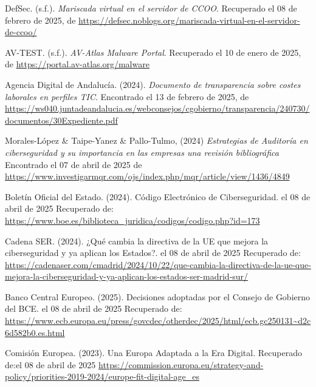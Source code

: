 \documentclass[a4paper, 10pt]{article}
\begin{document}
\begin{thebibliography}{20}
    
    DefSec. (s.f.). \textit{Mariscada virtual en el servidor de CCOO}. Recuperado el 08 de febrero de 2025, de \url{https://defsec.noblogs.org/mariscada-virtual-en-el-servidor-de-ccoo/}
    
    AV-TEST. (s.f.). \textit{AV-Atlas Malware Portal}. Recuperado el 10 de enero de 2025, de \url{https://portal.av-atlas.org/malware}
    
    Agencia Digital de Andalucía. (2024). \textit{Documento de transparencia sobre costes laborales en perfiles TIC}. Encontrado el 13 de febrero de 2025, de \url{https://ws040.juntadeandalucia.es/webconsejos/cgobierno/transparencia/240730/documentos/30Expediente.pdf}
    
    Morales-López \& Taipe-Yanez \& Pallo-Tulmo, (2024) \textit{Estrategias de Auditoría en ciberseguridad y su importancia en las empresas una revisión bibliográfica} Encontrado el 07 de abril de 2025 de \url{https://www.investigarmqr.com/ojs/index.php/mqr/article/view/1436/4849}

    Boletín Oficial del Estado. (2024). Código Electrónico de Ciberseguridad. el 08 de abril de 2025 Recuperado de: \url{https://www.boe.es/biblioteca_juridica/codigos/codigo.php?id=173}

    Cadena SER. (2024). ¿Qué cambia la directiva de la UE que mejora la ciberseguridad y ya aplican los Estados?. el 08 de abril de 2025 Recuperado de: \url{https://cadenaser.com/cmadrid/2024/10/22/que-cambia-la-directiva-de-la-ue-que-mejora-la-ciberseguridad-y-ya-aplican-los-estados-ser-madrid-sur/}

    Banco Central Europeo. (2025). Decisiones adoptadas por el Consejo de Gobierno del BCE. el 08 de abril de 2025 Recuperado de: \url{https://www.ecb.europa.eu/press/govcdec/otherdec/2025/html/ecb.gc250131~d2c6d582b0.es.html}

    Comisión Europea. (2023). Una Europa Adaptada a la Era Digital. Recuperado de:el 08 de abril de 2025  \url{https://commission.europa.eu/strategy-and-policy/priorities-2019-2024/europe-fit-digital-age_es}


\end{thebibliography}
\end{document}
